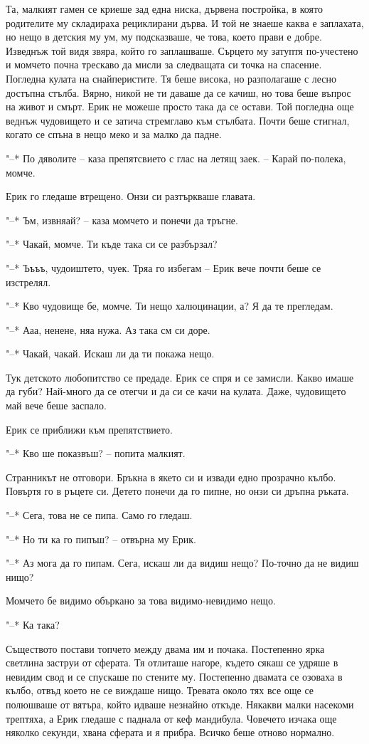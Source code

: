 \documentclass[ebook,openany,12pt]{memoir}
\begin{document}
Та, малкият гамен се криеше зад една ниска, дървена постройка, в която родителите му складираха рециклирани дърва. И той не знаеше каква е заплахата, но нещо в детския му ум, му подсказваше, че това, което прави е добре. Изведнъж той видя звяра, който го заплашваше. Сърцето му затуптя по-учестено и момчето почна трескаво да мисли за следващата си точка на спасение. Погледна кулата на снайперистите. Тя беше висока, но разполагаше с лесно достъпна стълба. Вярно, никой не ти даваше да се качиш, но това беше въпрос на живот и смърт. Ерик не можеше просто така да се остави. Той погледна още веднъж чудовището и се затича стремглаво към стълбата. Почти беше стигнал, когато се спъна в нещо меко и за малко да падне.

"--* По дяволите – каза препятсвието с глас на летящ заек. – Карай по-полека, момче.

Ерик го гледаше втрещено. Онзи си разтъркваше главата.

"--* Ъм, извняай? – каза момчето и понечи да тръгне.

"--* Чакай, момче. Ти къде така си се разбързал?

"--* Ъъъъ, чудоиштето, чуек. Тряа го избегам – Ерик вече почти беше се изстрелял.

"--* Кво чудовище бе, момче. Ти нещо халюцинации, а? Я да те прегледам.

"--* Ааа, ненене, няа нужа. Аз така см си доре.

"--* Чакай, чакай. Искаш ли да ти покажа нещо.

Тук детското любопитство се предаде. Ерик се спря и се замисли. Какво имаше да губи? Най-много да се отегчи и да си се качи на кулата. Даже, чудовището май вече беше заспало.

Ерик се приближи към препятствието.

"--* Кво ше показвъш? – попита малкият.

Странникът не отговори. Бръкна в якето си и извади едно прозрачно кълбо. Повъртя го в ръцете си. Детето понечи да го пипне, но онзи си дръпна ръката.

"--* Сега, това не се пипа. Само го гледаш.

"--* Но ти ка го пипъш? – отвърна му Ерик.

"--* Аз мога да го пипам. Сега, искаш ли да видиш нещо? По-точно да не видиш нищо?

Момчето бе видимо объркано за това видимо-неви\-димо нещо.

"--* Ка така?

Съществото постави топчето между двама им и почака. Постепенно ярка светлина заструи от сферата. Тя отлиташе нагоре, където сякаш се удряше в невидим свод и се спускаше по стените му. Постепенно двамата се озоваха в кълбо, отвъд което не се виждаше нищо. Тревата около тях все още се полюшваше от вятъра, който идваше незнайно откъде. Някакви малки насекоми трептяха, а Ерик гледаше с паднала от кеф мандибула. Човечето изчака още няколко секунди, хвана сферата и я прибра. Всичко беше отново нормално.
\end{document}
